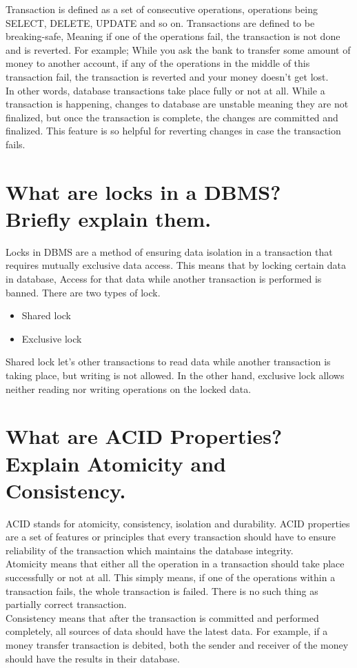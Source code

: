 \documentclass[twocolumn,a4paper, 10pt]{article}
\begin{document}
        Transaction is defined as a set of consecutive operations, operations being SELECT, DELETE, UPDATE and so on.
        Transactions are defined to be breaking-safe, Meaning if one of the operations fail, the transaction is not done and 
        is reverted. For example; While you ask the bank to transfer some amount of money to another account, if 
        any of the operations in the middle of this transaction fail, the transaction is reverted and your money doesn't get lost. \\ 
        In other words, database transactions take place fully or not at all.
        While a transaction is happening, changes to database are unstable meaning they are not finalized, but once the transaction is 
        complete, the changes are committed and finalized. This feature is so helpful for reverting changes in case the transaction fails. 

    \section{What are locks in a DBMS? Briefly explain them.}

        Locks in DBMS are a method of ensuring data isolation in a transaction that requires mutually exclusive data access.
        This means that by locking certain data in database, Access for that data while another transaction is performed is banned.
        There are two types of lock. 
        \begin{itemize}
            \item Shared lock 
            \item Exclusive lock
        \end{itemize}
        Shared lock let's other transactions to read data while another transaction is taking place, but writing is not allowed. 
        In the other hand, exclusive lock allows neither reading nor writing operations on the locked data.
    \section{What are ACID Properties? Explain Atomicity and Consistency.}

        ACID stands for atomicity, consistency, isolation and durability. ACID properties are a set of features or principles that 
        every transaction should have to ensure reliability of the transaction which maintains the database integrity. \\ 
        Atomicity means that either all the operation in a transaction should take place successfully or not at all. This simply means,
        if one of the operations within a transaction fails, the whole transaction is failed. There is no such thing as partially 
        correct transaction. \\ 
        Consistency means that after the transaction is committed and performed completely, all sources of data should have the latest data. 
        For example, if a money transfer transaction is debited, both the sender and receiver of the money should have the results in their database. \\ 
\end{document}
